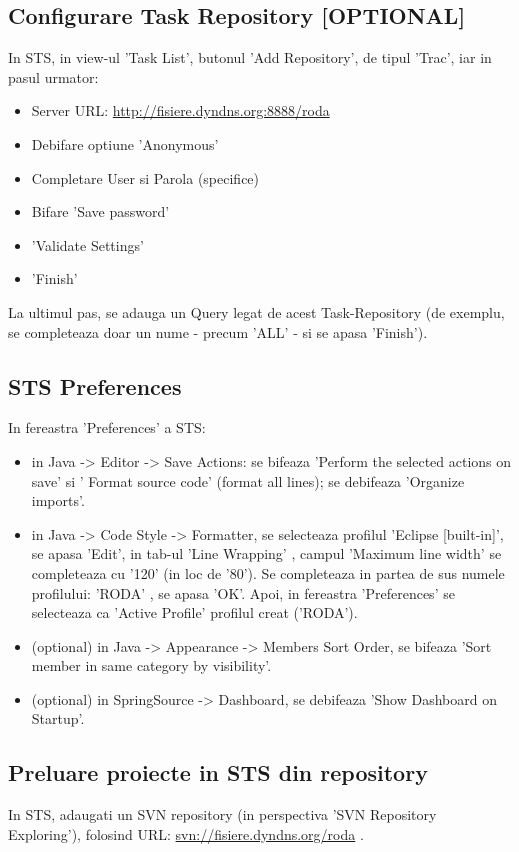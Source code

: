 \subsection{Configurare Task Repository [OPTIONAL]}
In STS, in view-ul 'Task List', butonul 'Add Repository', de tipul 'Trac', 
iar in pasul urmator:
\begin{itemize}
\item 
Server URL:    \url{http://fisiere.dyndns.org:8888/roda}
\item
Debifare optiune 'Anonymous'
\item
Completare User si Parola (specifice)
\item
Bifare 'Save password'
\item
'Validate Settings'
\item
'Finish'
\end{itemize}

La ultimul pas, se adauga un Query legat de acest Task-Repository (de exemplu,
se completeaza doar un nume - precum 'ALL' - si se apasa 'Finish').

\subsection{STS Preferences}
In fereastra 'Preferences' a STS:
\begin{itemize}
\item
in Java -> Editor -> Save Actions: se bifeaza 'Perform the selected actions on save' si ' Format source code' (format all lines); se debifeaza 'Organize imports'.
\item
in Java -> Code Style -> Formatter, se selecteaza profilul 'Eclipse [built-in]', se apasa 'Edit', in tab-ul 'Line Wrapping' , campul 'Maximum line width' se completeaza cu '120' (in loc de '80').
Se completeaza in partea de sus numele profilului: 'RODA' , se apasa 'OK'. Apoi, in fereastra 'Preferences' se selecteaza ca 'Active Profile' profilul creat ('RODA').
\item
(optional) in Java -> Appearance -> Members Sort Order, se bifeaza 'Sort member in same category by visibility'.
\item
(optional) in SpringSource -> Dashboard, se debifeaza 'Show Dashboard on Startup'.
\end{itemize}

\subsection{Preluare proiecte in STS din repository}
In STS, adaugati un SVN repository 
(in perspectiva 'SVN Repository Exploring'), 
folosind URL: \url{svn://fisiere.dyndns.org/roda} .

